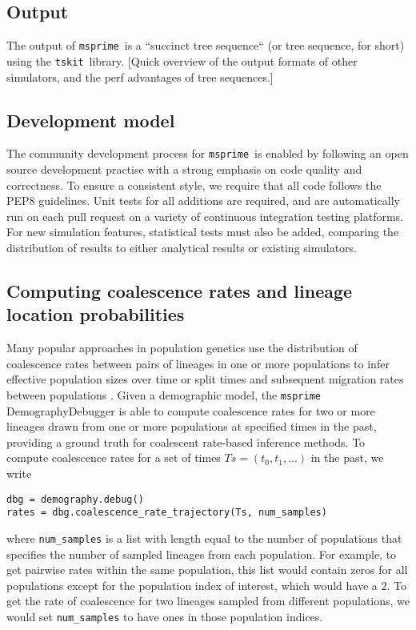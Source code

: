 \documentclass{article}
\newcommand{\msprime}[0]{\texttt{msprime}}
\newcommand{\tskit}[0]{\texttt{tskit}}
\newcommand{\msprime}[0]{{\texttt{msprime} }}
\newcommand{\tskit}[0]{{\texttt{tskit} }}
\begin{document}
\subsection*{Output}
The output of \msprime\ is a ``succinct tree sequence`` (or tree sequence,
for short) using the \tskit\ library. [Quick overview of the output formats
of other simulators, and the perf advantages of tree sequences.]

\subsection*{Development model}
The community development process for \msprime\ is enabled by following an
open source development practise with a strong emphasis on code quality
and correctness. To ensure a consistent style, we require that all code
follows the PEP8 guidelines. Unit tests for all additions are required, and
are automatically run on each pull request on a variety of continuous
integration testing platforms. For new simulation features, statistical tests
must also be added, comparing the distribution of results to either analytical
results or existing simulators.

\subsection*{Computing coalescence rates and lineage location probabilities}
Many popular approaches in population genetics use the distribution of coalescence rates between 
pairs of lineages in one or more populations to infer effective population sizes over time 
\cite{li2011inference,sheehan2013estimating,schiffels2014inferring}
or split times 
and subsequent migration rates between populations 
\cite{wang2020tracking}.
Given a demographic model, the 
\texttt{msprime} DemographyDebugger is able to compute coalescence rates for two or more lineages drawn 
from one or more populations at specified times in the past, providing a ground truth for coalescent rate-based 
inference methods. To compute coalescence rates for a set of times $Ts=(t_0, t_1, \ldots)$ in the 
past, we write
\begin{lstlisting}[frame=single]
dbg = demography.debug()
rates = dbg.coalescence_rate_trajectory(Ts, num_samples)
\end{lstlisting}
where \texttt{num\_samples} is a list with length equal to the number of populations that
specifies the number of sampled lineages from each population. For example, 
to get pairwise rates within the same 
population, this list would contain zeros for all populations except for the population index of interest, 
which would have a $2$. To get the rate of coalescence for two lineages sampled from different 
populations, we would set \texttt{num\_samples} to have ones in those population indices.
\end{document}
